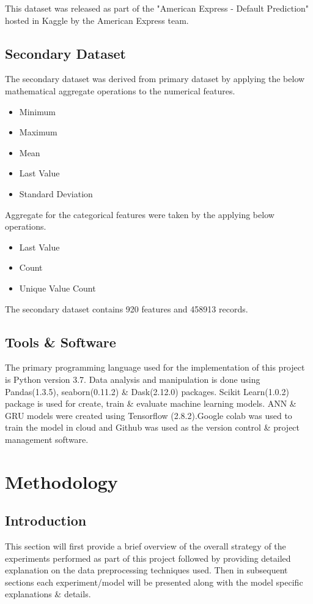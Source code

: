 \documentclass[twoside,11pt,a4paper]{article}
\begin{document}
This dataset\citep{amex-default-prediction-dataset} was released as part of the "American Express - Default Prediction" hosted in Kaggle by the American Express team.

\subsection{Secondary Dataset}
The secondary dataset was derived from primary dataset by applying the below mathematical aggregate operations to the numerical features.
\begin{itemize}
	\item Minimum 
	\item Maximum
	\item Mean
	\item Last Value
	\item Standard Deviation
\end{itemize}

Aggregate for the categorical features were taken by the applying below operations.
\begin{itemize}
	\item Last Value
	\item Count
	\item Unique Value Count
\end{itemize}

The secondary dataset contains 920 features and 458913 records.

\subsection{Tools \& Software}
The primary programming language used for the implementation of this project is Python version 3.7. Data analysis and manipulation is done using Pandas(1.3.5), seaborn(0.11.2) \& Dask(2.12.0) packages. Scikit Learn(1.0.2) package is used for create, train \& evaluate machine learning models. \acs{ANN} \& \acs{GRU} models were created using Tensorflow (2.8.2).Google colab was used to train the model in cloud and Github was used as the version control \& project management software.

\vfill
\clearpage
\section{Methodology}\label{sec:methodology}
\subsection{Introduction}
This section will first provide a brief overview of the overall strategy of the experiments performed as part of this project followed by  providing detailed explanation on the data preprocessing techniques used. Then in subsequent sections each experiment/model will be presented along with the model specific explanations \& details.
\vfill
\clearpage
\end{document}

